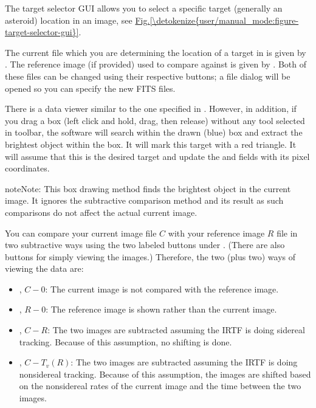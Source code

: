 \documentclass[letterpaper,11pt,english]{sphinxmanual}
\begin{document}
\sphinxAtStartPar
The target selector GUI allows you to select a specific target (generally an
asteroid) location in an image, see \hyperref[\detokenize{user/manual_mode:figure-target-selector-gui}]{Fig.\@ \ref{\detokenize{user/manual_mode:figure-target-selector-gui}}}.

\sphinxAtStartPar
The current file which you are determining the location of a target in is
given by . The reference image (if provided) used to
compare against is given by . Both of these files can
be changed using their respective  buttons; a file dialog
will be opened so you can specify the new FITS files.

\sphinxAtStartPar
There is a data viewer similar to the one specified in
{\hyperref[\detokenize{user/manual_mode:user-manual-mode-graphical-user-interface}]{}}. However, in addition, if you
drag a box (left click and hold, drag, then release) without any tool selected
in toolbar, the software will search within the drawn (blue) box and
extract the brightest object within the box. It will mark this target with a
red triangle. It will assume that this is the desired target and update the
 and  fields with its pixel coordinates.

\begin{sphinxadmonition}{note}{Note:}
\sphinxAtStartPar
This box drawing method finds the brightest object in the current image.
It ignores the subtractive comparison method and its result as such
comparisons do not affect the actual current image.
\end{sphinxadmonition}

\sphinxAtStartPar
You can compare your current image file \(C\) with your reference image
\(R\) file in two subtractive ways using the two labeled buttons under
. (There are also buttons for simply viewing
the images.) Therefore, the two (plus two) ways of viewing the data are:
\begin{itemize}
\item {} 
\sphinxAtStartPar
{}, \(C-0\): The current image is not compared with the reference image.

\item {} 
\sphinxAtStartPar
{}, \(R-0\): The reference image is shown rather than the current image.

\item {} 
\sphinxAtStartPar
{}, \(C-R\): The two images are subtracted assuming the IRTF is doing sidereal tracking. Because of this assumption, no shifting is done.

\item {} 
\sphinxAtStartPar
{}, \(C-T_v(R)\): The two images are subtracted assuming the IRTF is doing non\sphinxhyphen{}sidereal tracking. Because of this assumption, the images are shifted based on the non\sphinxhyphen{}sidereal rates of the current image and the time between the two images.

\end{itemize}
\end{document}
